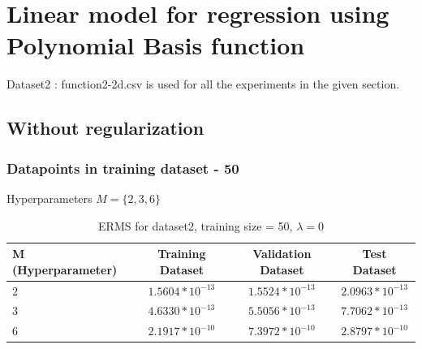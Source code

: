\documentclass[11pt]{article}
\begin{document}
\section{Linear model for regression using Polynomial Basis function}
Dataset2 : function2-2d.csv is used for all the experiments in the given section.
\subsection{Without regularization}
\subsubsection{Datapoints in training dataset - 50}
Hyperparameters $M = \{2,3,6\}$
\begin{table}[h]
\label{tab:tab2.1.1}
\begin{center}
\begin{tabular}{|l|c|c|c|}
\hline
\textbf{M (Hyperparameter)} & \textbf{Training Dataset} & \textbf{Validation Dataset} &\textbf{Test Dataset}\\
\hline
$2$ & $1.5604*10^{-13}$ & $1.5524*10^{-13}$ & $2.0963*10^{-13}$\\
\hline
$3$ & $4.6330*10^{-13}$ & $5.5056*10^{-13}$ & $7.7062*10^{-13}$\\
\hline
$6$ & $2.1917*10^{-10}$ & $7.3972*10^{-10}$ & $2.8797*10^{-10}$\\
\hline
\end{tabular}
\caption{ERMS for dataset2, training size = 50, $\lambda = 0$}
\end{center}
\end{table}
\end{document}
